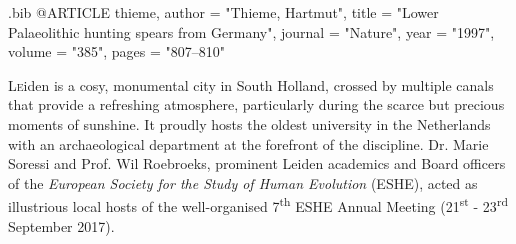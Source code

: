 \def\IJSRAidentifier{\currfilebase} %
\def\submission{}%
\def\acceptance{}%
\def\shorttitle{ESHE Meeting Review}
\def\maintitle{Review of the European Society for the Study of Human Evolution – 7\textsuperscript{th} Annual Meeting, September 21\textsuperscript{st} - 23\textsuperscript{rd} 2017 Leiden, The Netherlands}
\def\cmail{gonzlinares@gmail.com}
\undef\keywords%
\def\authorone{Gonzalo Linares Matás}
\def\bioone{}
\def\affilone{St. Hugh’s College, University of Oxford}

\begin{filecontents}{\IJSRAidentifier.bib}
	@ARTICLE {thieme,
		author  = "Thieme, Hartmut",
		title   = "Lower Palaeolithic hunting spears from Germany",
		journal = "Nature",
		year    = "1997",
		volume  = "385",
		pages   = "807–810"
	}
\end{filecontents}
\IJSRAopening%
\lettrine{L}{e}iden is a cosy, monumental city in South Holland, crossed by multiple canals that provide a refreshing atmosphere, particularly during the scarce but precious moments of sunshine. It proudly hosts the oldest university in the Netherlands with an archaeological department at the forefront of the discipline. Dr. Marie Soressi and Prof. Wil Roebroeks, prominent Leiden academics and Board officers of the \emph{European Society for the Study of Human Evolution} (ESHE), acted as illustrious local hosts of the well-organised 7\textsuperscript{th} ESHE Annual Meeting (21\textsuperscript{st} - 23\textsuperscript{rd} September 2017).

